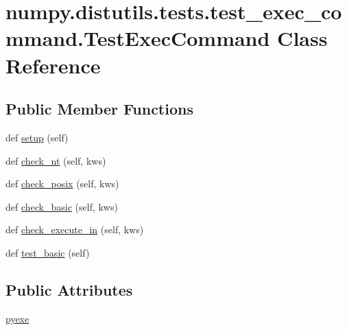 \hypertarget{classnumpy_1_1distutils_1_1tests_1_1test__exec__command_1_1TestExecCommand}{}\section{numpy.\+distutils.\+tests.\+test\+\_\+exec\+\_\+command.\+Test\+Exec\+Command Class Reference}
\label{classnumpy_1_1distutils_1_1tests_1_1test__exec__command_1_1TestExecCommand}
\subsection*{Public Member Functions}
\begin{DoxyCompactItemize}
\item 
def \hyperlink{classnumpy_1_1distutils_1_1tests_1_1test__exec__command_1_1TestExecCommand_a9fbd66a52db339b2ca98ffbf8caecd19}{setup} (self)
\item 
def \hyperlink{classnumpy_1_1distutils_1_1tests_1_1test__exec__command_1_1TestExecCommand_a46d3b2af1d9aaa72a29ed7f2c42f088d}{check\+\_\+nt} (self, kws)
\item 
def \hyperlink{classnumpy_1_1distutils_1_1tests_1_1test__exec__command_1_1TestExecCommand_a604d0f8a9d24a31442229076ecc41fec}{check\+\_\+posix} (self, kws)
\item 
def \hyperlink{classnumpy_1_1distutils_1_1tests_1_1test__exec__command_1_1TestExecCommand_a3e9cfd7f85e9f9828addd2e41f53484b}{check\+\_\+basic} (self, kws)
\item 
def \hyperlink{classnumpy_1_1distutils_1_1tests_1_1test__exec__command_1_1TestExecCommand_a5756b57344f35b0bf617d9b4068e7ea1}{check\+\_\+execute\+\_\+in} (self, kws)
\item 
def \hyperlink{classnumpy_1_1distutils_1_1tests_1_1test__exec__command_1_1TestExecCommand_a8a1b1371aba881a85d6c72c6a3c15302}{test\+\_\+basic} (self)
\end{DoxyCompactItemize}
\subsection*{Public Attributes}
\begin{DoxyCompactItemize}
\item 
\hyperlink{classnumpy_1_1distutils_1_1tests_1_1test__exec__command_1_1TestExecCommand_a1a18b0e2902e793fb816c41ed0c95500}{pyexe}
\end{DoxyCompactItemize}


